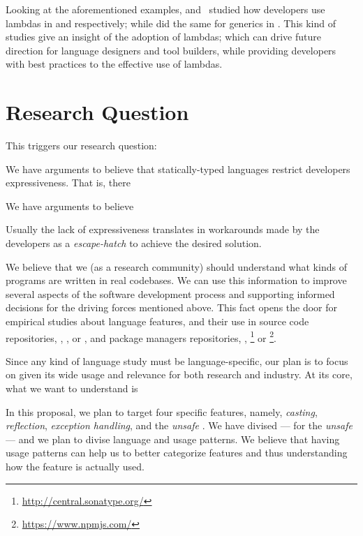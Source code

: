 Looking at the aforementioned examples, \cite{mazinanian_understanding_2017} and~\cite{uesbeck_empirical_2016}
studied how developers use lambdas in \java{} and \cpp{} respectively; while \cite{parnin_java_2011,parnin_adoption_2013} did the same for generics in \java{}.
This kind of studies give an insight of the adoption of lambdas;
which can drive future direction for language designers and tool builders,
while providing developers with best practices to the effective use of lambdas.


\section{Research Question}

This triggers our research question:



We have arguments to believe that statically-typed languages restrict developers expressiveness.
That is, there 

We have arguments to believe

Usually the lack of expressiveness translates in workarounds made by the developers as a \emph{escape-hatch} to achieve the desired solution.


We believe that we (as a research community) should understand what kinds of programs are written in real codebases.
We can use this information to improve several aspects of the software development process and supporting informed decisions for the driving forces mentioned above.
This fact opens the door for empirical studies about language features, and their use in source code repositories, \eg{}, \github{}, \gitlab{} or \bitbucket{}, and package managers repositories, \eg{}, \mavencentral{}\footnote{\url{http://central.sonatype.org/}} or
\npm{}\footnote{\url{https://www.npmjs.com/}}.

Since any kind of language study must be language-specific, our plan is to focus on \java{} given its wide usage and relevance for both research and industry.
At its core, what we want to understand is



In this proposal, we plan to target four specific \java{} features, namely, \emph{casting}, \emph{reflection}, \emph{exception handling}, and the \emph{unsafe \api{}}.
We have divised --- for the \emph{unsafe} \api{} --- and we plan to divise language and \api{} usage patterns.
We believe that having usage patterns can help us to better categorize features and thus understanding how the feature is actually used.


